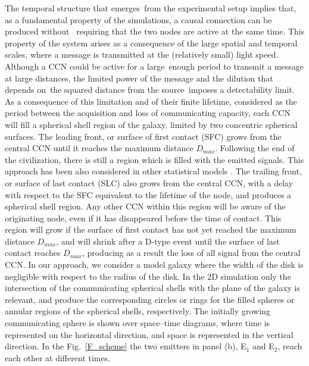 \documentclass[crop]{CSLB}
\newcommand{\ceti}{CCN}
\begin{document}

The temporal structure that emerges from the experimental setup implies that, as a fundamental property of the simulations, a causal connection can be produced without 
requiring that the two nodes are active at the same time.
%
This property of the system arises as a consequence of the large spatial and temporal scales, where a message is transmitted at the (relatively small) light speed.
%
Although a \ceti{} could be active for a large enough period to transmit a message at large distances, the limited power of the message and the dilution that depends on the squared distance from the source imposes a detectability limit.
%
As a consequence of this limitation and of their finite lifetime, considered as the period between the acquisition and loss of communicating capacity, each \ceti{} will fill a spherical shell region of the galaxy, limited by two concentric spherical surfaces.
%
The leading front, or surface of first contact (SFC) grows from the central \ceti{} until it reaches the maximum distance $D_{max}$.
%
Following the end of the civilization, there is still a region which is filled with the emitted signals.
%
This approach has been also considered in other statistical models \citep[e.g., ][]{smith_broadcasting_2009, grimaldi_signal_2017, Grimaldi2018}.
%
The trailing front, or surface of last contact (SLC) also grows from the central \ceti{}, with a delay with respect to the SFC equivalent to the lifetime of the node, and produces a spherical shell region.
%
Any other \ceti{} within this region will be aware of the originating node, even if it has disappeared before the time of contact.
%
This region will grow if the surface of first contact has not yet reached the maximum distance $D_{max}$, and will shrink after a D-type event until the surface of last contact reaches $D_{max}$, producing as a result the loss of all signal from the central \ceti{}.
%
In our approach, we consider a model galaxy where the width of the disk is negligible with respect to the radius of the disk.
%
In the 2D simulation only the intersection of the communicating spherical shells with the plane of the galaxy is relevant, and produce the corresponding circles or rings for the filled spheres or annular regions of the spherical shells, respectively.
%
The initially growing communicating sphere is shown over space--time diagrams, where time is represented on the horizontal direction, and space is represented in the vertical direction.
%
In the Fig.~\ref{F_scheme} the two emitters in panel (b), E$_1$ and E$_2$, reach each other at different times.
\end{document}
